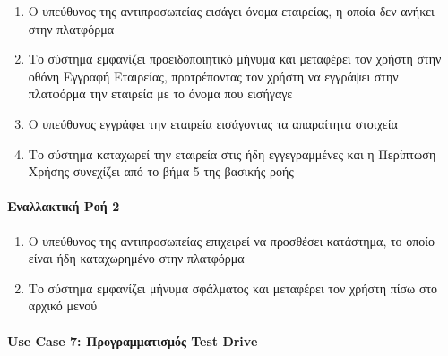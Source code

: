 \documentclass{../ol-softwaremanual}
\begin{document}
	\begin{enumerate}
		\item Ο υπεύθυνος της αντιπροσωπείας εισάγει όνομα εταιρείας, η οποία δεν ανήκει στην πλατφόρμα
		\item Το σύστημα εμφανίζει προειδοποιητικό μήνυμα και μεταφέρει τον χρήστη στην οθόνη Εγγραφή Εταιρείας, προτρέποντας τον χρήστη να εγγράψει στην πλατφόρμα την εταιρεία με το όνομα που εισήγαγε		
		\item Ο υπεύθυνος εγγράφει την εταιρεία εισάγοντας τα απαραίτητα στοιχεία
		\item Το σύστημα καταχωρεί την εταιρεία στις ήδη εγγεγραμμένες και η Περίπτωση Χρήσης συνεχίζει από το βήμα 5 της βασικής ροής
	\end{enumerate}
	
	\paragraph{Εναλλακτική Ροή 2}
	
\begin{enumerate}
			\item Ο υπεύθυνος της αντιπροσωπείας επιχειρεί να προσθέσει κατάστημα, το οποίο είναι ήδη καταχωρημένο στην πλατφόρμα
			\item Το σύστημα εμφανίζει μήνυμα σφάλματος και μεταφέρει τον χρήστη πίσω στο αρχικό μενού
	\end{enumerate}
	
	
	\paragraph{\en Use Case 7: \gr Προγραμματισμός \en Test Drive \gr}
	
\end{document}
